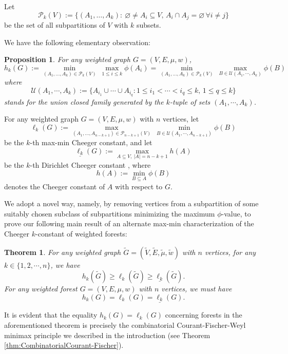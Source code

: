 \documentclass[12pt, reqno]{article}
\newtheorem{theorem}{Theorem}
\newtheorem{proposition}{Proposition}
\begin{document}
Let \[\mathcal{P}_k(V):=\{(A_1,\dots,A_{k}):~\varnothing\ne A_i\subseteq V,\,A_i\cap A_j=\varnothing\,\forall i\ne j\}\] be the set of all subpartitions of $V$ with $k$ subsets. 

We have the following elementary observation:
\begin{proposition}\label{prop:unioninv}
For any weighted graph $G=(V,E,\mu,w)$,
$$h_k(G):=\min_{(A_1,\dots,A_{k})\in \mathcal{P}_k(V)}~\max_{1\le i\le k}\phi(A_i)=\min_{(A_1,\dots,A_{k})\in \mathcal{P}_k(V)}~\max_{B\in \mathcal{U}(A_1,\cdots,A_{k})}\phi(B)$$
where \[\mathcal{U}(A_1,\cdots,A_k):=\{A_{i_1}\cup\cdots\cup A_{i_q}:1\le i_1<\cdots<i_q\le k,\,1\le q\le k\}\] stands for the union closed family generated by the $k$-tuple of sets $(A_1,\cdots,A_k)$. 
\end{proposition}
For any weighted graph $G=(V,E,\mu,w)$ with $n$ vertices, let 
$$\ell_k(G):=\max_{(A_1,\dots,A_{n-k+1})\in \mathcal{P}_{n-k+1}(V)}~\min_{B\in \mathcal{U}(A_1,\cdots,A_{n-k+1})}\phi(B)$$
be the $k$-th max-min Cheeger constant, and let $$\underline{\ell_k}(G) :=\max_{A\subseteq V,~|A|=n-k+1}h(A)$$ be the $k$-th Dirichlet Cheeger constant \cite{DTZ}, where \[h(A):=\min_{B\subseteq A}\phi(B)\] 
denotes the Cheeger constant of $A$ with respect to $G$. 


We adopt a novel way, namely, by removing vertices from a subpartition of some suitably chosen subclass of subpartitions minimizing the maximum $\phi$-value, to prove our following main result of an alternate max-min characterization of the Cheeger $k$-constant of weighted forests:
\begin{theorem}\label{thm:h_k=H_k}
For any weighted graph $\tilde G=(\tilde V,\tilde E,\tilde\mu,\tilde w)$ with $n$ vertices, for any $k\in\{1,2,\cdots,n\}$, we have \[h_k(\tilde G)\ge \ell_k(\tilde G)\ge \underline{\ell_k}(\tilde G).\] 
For any weighted forest $G=(V,E,\mu,w)$ with $n$ vertices, we must have \[h_k(G)= \ell_k(G)= \underline{\ell_k}(G).\]
\end{theorem}
It is evident that the equality $h_k(G)= \ell_k(G)$ concerning forests in the aforementioned theorem is precisely the combinatorial Courant-Fischer-Weyl minimax principle we described in the introduction (see Theorem \ref{thm:CombinatorialCourant-Fischer}).
\end{document}
